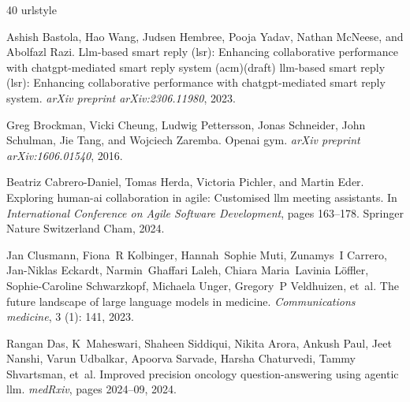 \begin{thebibliography}{40}
\providecommand{\natexlab}[1]{#1}
\providecommand{\url}[1]{\texttt{#1}}
\expandafter\ifx\csname urlstyle\endcsname\relax
  \providecommand{\doi}[1]{doi: #1}\else
  \providecommand{\doi}{doi: \begingroup \urlstyle{rm}\Url}\fi

Ashish Bastola, Hao Wang, Judsen Hembree, Pooja Yadav, Nathan McNeese, and Abolfazl Razi.
\newblock Llm-based smart reply (lsr): Enhancing collaborative performance with chatgpt-mediated smart reply system (acm)(draft) llm-based smart reply (lsr): Enhancing collaborative performance with chatgpt-mediated smart reply system.
\newblock \emph{arXiv preprint arXiv:2306.11980}, 2023.

Greg Brockman, Vicki Cheung, Ludwig Pettersson, Jonas Schneider, John Schulman, Jie Tang, and Wojciech Zaremba.
\newblock Openai gym.
\newblock \emph{arXiv preprint arXiv:1606.01540}, 2016.

Beatriz Cabrero-Daniel, Tomas Herda, Victoria Pichler, and Martin Eder.
\newblock Exploring human-ai collaboration in agile: Customised llm meeting assistants.
\newblock In \emph{International Conference on Agile Software Development}, pages 163--178. Springer Nature Switzerland Cham, 2024.

Jan Clusmann, Fiona~R Kolbinger, Hannah~Sophie Muti, Zunamys~I Carrero, Jan-Niklas Eckardt, Narmin~Ghaffari Laleh, Chiara Maria~Lavinia L{\"o}ffler, Sophie-Caroline Schwarzkopf, Michaela Unger, Gregory~P Veldhuizen, et~al.
\newblock The future landscape of large language models in medicine.
\newblock \emph{Communications medicine}, 3 (1): 141, 2023.

Rangan Das, K~Maheswari, Shaheen Siddiqui, Nikita Arora, Ankush Paul, Jeet Nanshi, Varun Udbalkar, Apoorva Sarvade, Harsha Chaturvedi, Tammy Shvartsman, et~al.
\newblock Improved precision oncology question-answering using agentic llm.
\newblock \emph{medRxiv}, pages 2024--09, 2024.


\end{thebibliography}

